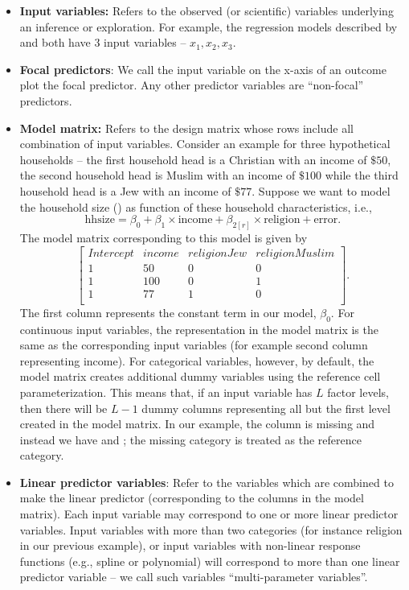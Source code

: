 \begin{itemize}
\item \textbf{Input variables:} Refers to the observed (or scientific) variables underlying an inference or exploration. For example, the regression models described by  and  both have $3$ input variables -- $x_1, x_2, x_3$.
\item \textbf{Focal predictors}: We call the input variable on the x-axis of an outcome plot the focal predictor.  Any other predictor variables are ``non-focal'' predictors. 

\item \textbf{Model matrix:} Refers to the design matrix whose rows include all combination of input variables. Consider an example for three hypothetical households -- the first household head is a Christian with an income of $\$ 50$, the second household head is Muslim with an income of $\$ 100$ while the third household head is a Jew with an income of $\$ 77$. Suppose we want to model the household size () as function of these household characteristics, i.e., $$\mathrm{hhsize} = \beta_0 + \beta_1\times\mathrm{income} + \beta_{2[r]}\times\mathrm{religion} + \mathrm{error}.$$ The model matrix corresponding to this model is given by
$$\begin{bmatrix}{}
 Intercept & income & religionJew & religionMuslim \\
 1 & 50 & 0 & 0 \\
  1 & 100 & 0 & 1 \\
  1 & 77 & 1 & 0 \\
\end{bmatrix}.$$ The first column represents the constant term in our model, $\beta_0$. For continuous input variables, the representation in the model matrix is the same as the corresponding input variables (for example second column representing income). For categorical variables, however, by default, the model matrix  creates additional dummy variables using the reference cell parameterization. This means that, if an input variable has $L$ factor levels, then there will be $L-1$ dummy columns representing all but the first level created in the model matrix. In our example, the column  is missing and instead we have  and ; the missing category  is treated as the reference category.

\item \textbf{Linear predictor variables}: Refer to the variables which are combined to make the linear predictor (corresponding to the columns in the model matrix). Each input variable may correspond to one or more linear predictor variables. Input variables with more than two categories (for instance religion in our previous example), or input variables with non-linear response functions (e.g., spline or polynomial) will correspond to more than one linear predictor variable -- we call such variables “multi-parameter variables”.


\end{itemize}
